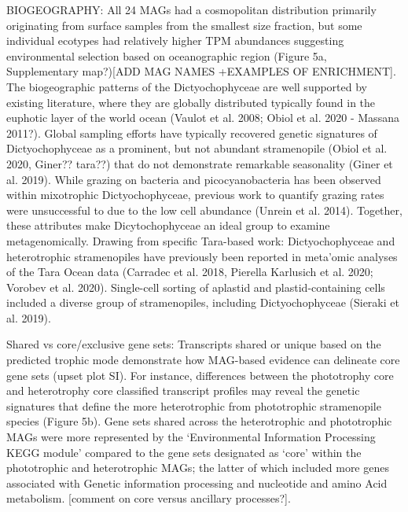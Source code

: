 \documentclass[12pt]{article}
\numberwithin{equation}{section}
\begin{document}
BIOGEOGRAPHY: All 24 MAGs had a cosmopolitan distribution primarily originating from surface samples from the smallest size fraction, but some individual ecotypes had relatively higher TPM abundances suggesting environmental selection based on oceanographic region (Figure 5a, Supplementary map?)[ADD MAG NAMES +EXAMPLES OF ENRICHMENT]. The biogeographic patterns of the Dictyochophyceae are well supported by existing literature, where they are globally distributed typically found in the euphotic layer of the world ocean (Vaulot et al. 2008; Obiol et al. 2020 - Massana 2011?). Global sampling efforts have typically recovered genetic signatures of Dictyochophyceae as a prominent, but not abundant stramenopile (Obiol et al. 2020, Giner?? tara??) that do not demonstrate remarkable seasonality (Giner et al. 2019). While grazing on bacteria and picocyanobacteria has been observed within mixotrophic Dictyochophyceae, previous work to quantify grazing rates were unsuccessful to due to the low cell abundance (Unrein et al. 2014). Together, these attributes make Dicytochophyceae an ideal group to examine metagenomically.
Drawing from specific Tara-based work: Dictyochophyceae and heterotrophic stramenopiles have previously been reported in meta’omic analyses of the Tara Ocean data (Carradec et al. 2018, Pierella Karlusich et al. 2020; Vorobev et al. 2020). Single-cell sorting of aplastid and plastid-containing cells included a diverse group of stramenopiles, including Dictyochophyceae (Sieraki et al. 2019).

Shared vs core/exclusive gene sets: Transcripts shared or unique based on the predicted trophic mode demonstrate how MAG-based evidence can delineate core gene sets (upset plot SI). For instance, differences between the phototrophy core and heterotrophy core classified transcript profiles may reveal the genetic signatures that define the more heterotrophic from phototrophic stramenopile species (Figure 5b). Gene sets shared across the heterotrophic and phototrophic MAGs were more represented by the ‘Environmental Information Processing KEGG module’ compared to the gene sets designated as ‘core’ within the phototrophic and heterotrophic MAGs; the latter of which included more genes associated with Genetic information processing and nucleotide and amino Acid metabolism. [comment on core versus ancillary processes?].
\end{document}

